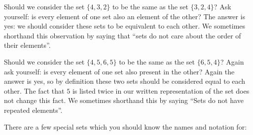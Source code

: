 Should we consider the set $\{4,3,2\}$ to be the same as the set $\{3,2,4\}$?  Ask yourself:  is every element of one set also an element of the other?  The answer is yes:  we should consider these sets to be equivalent to each other.  We sometimes shorthand this observation by saying that ``sets do not care about the order of their elements''.

Should we consider the set $\{4,5,6,5\}$ to be the same as the set $\{6,5,4\}$?  Again ask yourself:  is every element of one set also present in the other?  Again the answer is yes, so by definition these two sets should be considered equal to each other.  The fact that $5$ is listed twice in our written representation of the set does not change this fact.  We sometimes shorthand this by saying ``Sets do not have repeated elements''.

There are a few special sets which you should know the names and notation for:

